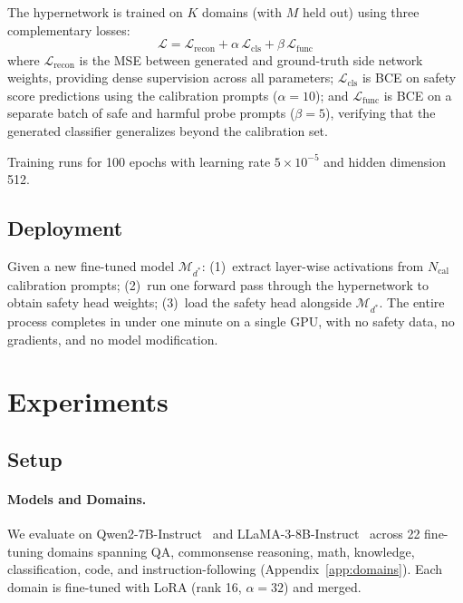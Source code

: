 \documentclass[11pt]{article}
\begin{document}
The hypernetwork is trained on $K$ domains (with $M$ held out) using three complementary losses:
\begin{equation}
    \mathcal{L} = \mathcal{L}_\text{recon} + \alpha\, \mathcal{L}_\text{cls} + \beta\, \mathcal{L}_\text{func}
\end{equation}
where $\mathcal{L}_\text{recon}$ is the MSE between generated and ground-truth side network weights, providing dense supervision across all parameters; $\mathcal{L}_\text{cls}$ is BCE on safety score predictions using the calibration prompts ($\alpha{=}10$); and $\mathcal{L}_\text{func}$ is BCE on a separate batch of safe and harmful probe prompts ($\beta{=}5$), verifying that the generated classifier generalizes beyond the calibration set.

Training runs for 100 epochs with learning rate $5 \times 10^{-5}$ and hidden dimension 512.

\subsection{Deployment}
\label{sec:deploy}

Given a new fine-tuned model $\mathcal{M}_{d^*}$: (1)~extract layer-wise activations from $N_\text{cal}$ calibration prompts; (2)~run one forward pass through the hypernetwork to obtain safety head weights; (3)~load the safety head alongside $\mathcal{M}_{d^*}$. The entire process completes in under one minute on a single GPU, with no safety data, no gradients, and no model modification.


\section{Experiments}
\label{sec:experiments}

\subsection{Setup}

\paragraph{Models and Domains.} We evaluate on Qwen2-7B-Instruct~\cite{yang2024qwen2} and LLaMA-3-8B-Instruct~\cite{dubey2024llama} across 22 fine-tuning domains spanning QA, commonsense reasoning, math, knowledge, classification, code, and instruction-following (Appendix~\ref{app:domains}). Each domain is fine-tuned with LoRA (rank 16, $\alpha{=}32$) and merged.
\end{document}
